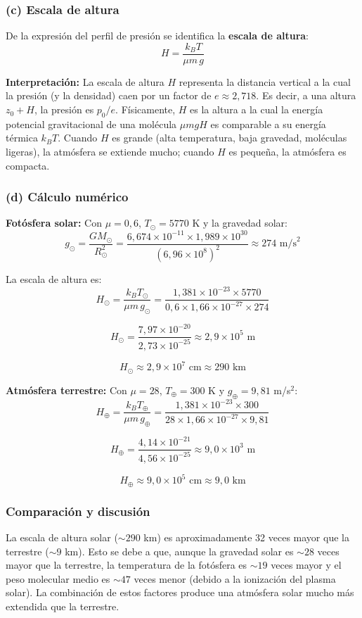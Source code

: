 \documentclass[a4paper]{article}
\begin{document}
\subsubsection{(c) Escala de altura}

De la expresión del perfil de presión se identifica la \textbf{escala de altura}:
$$
\boxed{H = \frac{k_B T}{\mu m\, g}}
$$

\textbf{Interpretación:} La escala de altura $H$ representa la distancia vertical a la cual la presión (y la densidad) caen por un factor de $e \approx 2{,}718$. Es decir, a una altura $z_0 + H$, la presión es $p_0/e$. Físicamente, $H$ es la altura a la cual la energía potencial gravitacional de una molécula $\mu m g H$ es comparable a su energía térmica $k_B T$. Cuando $H$ es grande (alta temperatura, baja gravedad, moléculas ligeras), la atmósfera se extiende mucho; cuando $H$ es pequeña, la atmósfera es compacta.

\subsubsection{(d) Cálculo numérico}

\textbf{Fotósfera solar:} Con $\mu = 0{,}6$, $T_\odot = 5770$ K y la gravedad solar:
$$
g_\odot = \frac{GM_\odot}{R_\odot^2} = \frac{6{,}674 \times 10^{-11} \times 1{,}989 \times 10^{30}}{(6{,}96 \times 10^8)^2} \approx 274 \text{ m/s}^2
$$

La escala de altura es:
$$
H_\odot = \frac{k_B T_\odot}{\mu m\, g_\odot} = \frac{1{,}381 \times 10^{-23} \times 5770}{0{,}6 \times 1{,}66 \times 10^{-27} \times 274}
$$

$$
H_\odot = \frac{7{,}97 \times 10^{-20}}{2{,}73 \times 10^{-25}} \approx 2{,}9 \times 10^5 \text{ m}
$$

$$
\boxed{H_\odot \approx 2{,}9 \times 10^7 \text{ cm} \approx 290 \text{ km}}
$$

\textbf{Atmósfera terrestre:} Con $\mu = 28$, $T_\oplus = 300$ K y $g_\oplus = 9{,}81$ m/s$^2$:
$$
H_\oplus = \frac{k_B T_\oplus}{\mu m\, g_\oplus} = \frac{1{,}381 \times 10^{-23} \times 300}{28 \times 1{,}66 \times 10^{-27} \times 9{,}81}
$$

$$
H_\oplus = \frac{4{,}14 \times 10^{-21}}{4{,}56 \times 10^{-25}} \approx 9{,}0 \times 10^3 \text{ m}
$$

$$
\boxed{H_\oplus \approx 9{,}0 \times 10^5 \text{ cm} \approx 9{,}0 \text{ km}}
$$

\subsubsection{Comparación y discusión}

La escala de altura solar ($\sim 290$ km) es aproximadamente 32 veces mayor que la terrestre ($\sim 9$ km). Esto se debe a que, aunque la gravedad solar es $\sim 28$ veces mayor que la terrestre, la temperatura de la fotósfera es $\sim 19$ veces mayor y el peso molecular medio es $\sim 47$ veces menor (debido a la ionización del plasma solar). La combinación de estos factores produce una atmósfera solar mucho más extendida que la terrestre.
\end{document}
